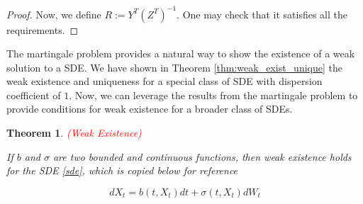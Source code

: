 \documentclass{article}
\newtheorem{theorem}{Theorem}
\begin{document}
\begin{proof}
Now, we define $R:=Y^T(Z^T)^{-1}$. One may check that it satisfies all the requirements. 

\end{proof}

The martingale problem provides a natural way to show the existence of a weak solution to a SDE. We have shown in Theorem \ref{thm:weak_exist_unique} the weak existence and uniqueness for a special class of SDE with dispersion coefficient of $1$. Now, we can leverage the results from the martingale problem to provide conditions for weak existence for a broader class of SDEs. 

\begin{theorem} \textcolor{red}{(Weak Existence)}

If $b$ and $\sigma$ are two bounded and continuous functions, then weak existence holds for the SDE
\eqref{sde}, which is copied below for reference

\begin{equation*}
dX_t=b(t,X_t)dt+\sigma(t,X_t)dW_t
\end{equation*}
\end{theorem}
\end{document}
